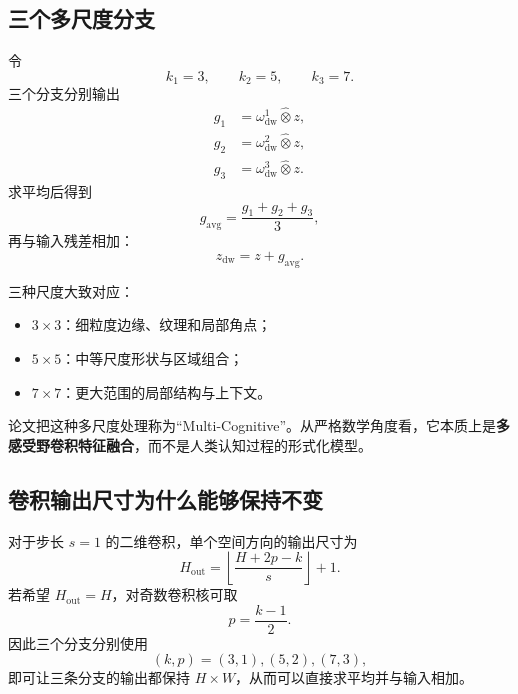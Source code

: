 \documentclass[UTF8,12pt,a4paper,fontset=none]{ctexart}
\begin{document}
\subsection{三个多尺度分支}

令
\begin{equation}
 k_1=3,\qquad k_2=5,\qquad k_3=7.
\end{equation}
三个分支分别输出
\begin{align}
 g_1&=\omega_{\mathrm{dw}}^1\widehat{\otimes}z,\\
 g_2&=\omega_{\mathrm{dw}}^2\widehat{\otimes}z,\\
 g_3&=\omega_{\mathrm{dw}}^3\widehat{\otimes}z.
\end{align}
求平均后得到
\begin{equation}
 g_{\mathrm{avg}}=\frac{g_1+g_2+g_3}{3},
\end{equation}
再与输入残差相加：
\begin{equation}
 z_{\mathrm{dw}}=z+g_{\mathrm{avg}}.
\end{equation}

三种尺度大致对应：
\begin{itemize}
  \item $3\times3$：细粒度边缘、纹理和局部角点；
  \item $5\times5$：中等尺度形状与区域组合；
  \item $7\times7$：更大范围的局部结构与上下文。
\end{itemize}

论文把这种多尺度处理称为“Multi-Cognitive”。从严格数学角度看，它本质上是\textbf{多感受野卷积特征融合}，而不是人类认知过程的形式化模型。



\subsection{卷积输出尺寸为什么能够保持不变}

对于步长 $s=1$ 的二维卷积，单个空间方向的输出尺寸为
\begin{equation}
 H_{\mathrm{out}}
 =\left\lfloor\frac{H+2p-k}{s}\right\rfloor+1.
\end{equation}
若希望 $H_{\mathrm{out}}=H$，对奇数卷积核可取
\begin{equation}
 p=\frac{k-1}{2}.
\end{equation}
因此三个分支分别使用
\begin{equation}
 (k,p)=(3,1),(5,2),(7,3),
\end{equation}
即可让三条分支的输出都保持 $H\times W$，从而可以直接求平均并与输入相加。
\end{document}
